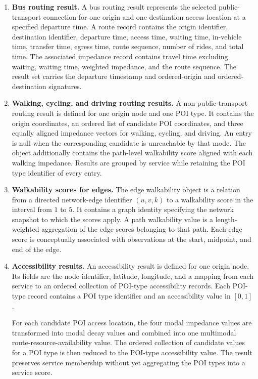 \begin{enumerate}
    \item \textbf{Bus routing result.}
    A bus routing result represents the selected public-transport connection for
    one origin and one destination access location at a specified departure
    time. A route record contains the origin identifier, destination identifier,
    departure time, access time, waiting time, in-vehicle time, transfer time,
    egress time, route sequence, number of rides, and total time. The associated
    impedance record contains travel time excluding waiting, waiting time,
    weighted impedance, and the route sequence. The result set carries the
    departure timestamp and ordered-origin and ordered-destination signatures.

    \item \textbf{Walking, cycling, and driving routing results.}
    A non-public-transport routing result is defined for one origin node and one
    POI type. It contains the origin coordinates, an ordered list of candidate
    POI coordinates, and three equally aligned impedance vectors for walking,
    cycling, and driving. An entry is null when the corresponding candidate is
    unreachable by that mode. The object additionally contains the path-level
    walkability score aligned with each walking impedance. Results are grouped
    by service while retaining the POI type identifier of every entry.

    \item \textbf{Walkability scores for edges.}
    The edge walkability object is a relation from a directed network-edge
    identifier \((u,v,k)\) to a walkability score in the interval from \(1\) to
    \(5\). It contains a graph identity specifying the network snapshot to which
    the scores apply. A path walkability value is a length-weighted aggregation
    of the edge scores belonging to that path. Each edge score is conceptually
    associated with observations at the start, midpoint, and end of the edge.

    \item \textbf{Accessibility results.}
    An accessibility result is defined for one origin node. Its fields are the
    node identifier, latitude, longitude, and a mapping from each service to an
    ordered collection of POI-type accessibility records. Each POI-type record
    contains a POI type identifier and an accessibility value in \([0,1]\).

    For each candidate POI access location, the four modal impedance values are
    transformed into modal decay values and combined into one multimodal
    route-resource-availability value. The ordered collection of candidate
    values for a POI type is then reduced to the POI-type accessibility value.
    The result preserves service membership without yet aggregating the POI
    types into a service score.


\end{enumerate}
